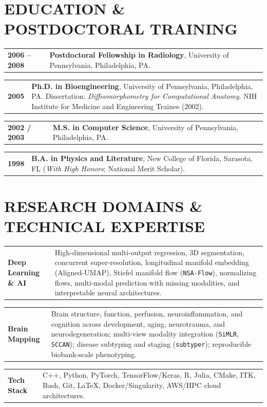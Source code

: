 \documentclass[10pt,letterpaper]{article}
\makeatletter
\newcommand{\cvline}[2]{%
  \noindent\begin{tabularx}{\textwidth}{@{} >{\raggedright\arraybackslash\bfseries\footnotesize\color{accent}}p{1.15in} >{\footnotesize\arraybackslash}X @{}}
    #1 & #2
  \end{tabularx}\par\vspace{2pt}%
}
\makeatother
\begin{document}
\section{EDUCATION \& POSTDOCTORAL TRAINING}
\cvline{2006 -- 2008}{\textbf{Postdoctoral Fellowship in Radiology}, University of Pennsylvania, Philadelphia, PA.}
\cvline{2005}{\textbf{Ph.D. in Bioengineering}, University of Pennsylvania, Philadelphia, PA. Dissertation: \textit{Diffeomorphometry for Computational Anatomy}. NIH Institute for Medicine and Engineering Trainee (2002).}
\cvline{2002 / 2003}{\textbf{M.S. in Computer Science}, University of Pennsylvania, Philadelphia, PA.}
\cvline{1998}{\textbf{B.A. in Physics and Literature}, New College of Florida, Sarasota, FL (\textit{With High Honors}; National Merit Scholar).}

\section{RESEARCH DOMAINS \& TECHNICAL EXPERTISE}
\cvline{Deep Learning \& AI}{High-dimensional multi-output regression, 3D segmentation, concurrent super-resolution, longitudinal manifold embedding (Aligned-UMAP), Stiefel manifold flow (\texttt{NSA-Flow}), normalizing flows, multi-modal prediction with missing modalities, and interpretable neural architectures.}
\cvline{Brain Mapping}{Brain structure, function, perfusion, neuroinflammation, and cognition across development, aging, neurotrauma, and neurodegeneration; multi-view modality integration (\texttt{SiMLR}, \texttt{SCCAN}); disease subtyping and staging (\texttt{subtyper}); reproducible biobank-scale phenotyping.}
\cvline{Tech Stack}{C++, Python, PyTorch, TensorFlow/Keras, R, Julia, CMake, ITK, Bash, Git, LaTeX, Docker/Singularity, AWS/HPC cloud architectures.}

\end{document}
